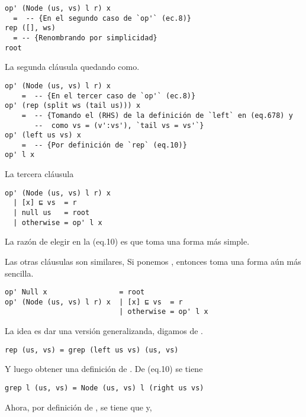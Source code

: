 \begin{verbatim}
op' (Node (us, vs) l r) x
  =  -- {En el segundo caso de `op'` (ec.8)}
rep ([], ws)
  = -- {Renombrando por simplicidad}
root
\end{verbatim}
La segunda cláusula quedando como. %

\begin{verbatim}
op' (Node (us, vs) l r) x
    =  -- {En el tercer caso de `op'` (ec.8)}
op' (rep (split ws (tail us))) x
    =  -- {Tomando el (RHS) de la definición de `left` en (eq.678) y 
       --  como vs = (v':vs'), `tail vs = vs'`}
op' (left us vs) x
    =  -- {Por definición de `rep` (eq.10)}
op' l x
\end{verbatim}
La tercera cláusula %

\begin{verbatim}
op' (Node (us, vs) l r) x
  | [x] ⊑ vs  = r
  | null us   = root
  | otherwise = op' l x
\end{verbatim}

La razón de elegir  en la (eq.10) es que  toma una forma más simple.

Las otras cláusulas son similares, Si ponemos , entonces  toma una forma aún más sencilla.
\begin{verbatim}
op' Null x                 = root
op' (Node (us, vs) l r) x  | [x] ⊑ vs  = r
                           | otherwise = op' l x
\end{verbatim}


La idea es dar una versión generalizanda, digamos  de .

\begin{verbatim}
rep (us, vs) = grep (left us vs) (us, vs)
\end{verbatim}

Y luego obtener una definición de . De (eq.10) se tiene

\begin{verbatim}
grep l (us, vs) = Node (us, vs) l (right us vs)
\end{verbatim}

Ahora, por definición de , se tiene que  y,

